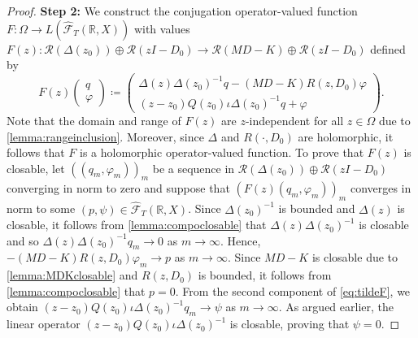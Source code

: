 \documentclass[english]{myarticle}
\begin{document}
\begin{sloppypar}
\begin{proof}
\textbf{Step 2:} We construct the conjugation operator-valued function $F : \Omega \to L(\hat{\mathcal{F}}_T(\mathbb{R},X))$ with values $F(z) : \mathcal{R}(\Delta(z_0)) \oplus \mathcal{R}(zI-D_0) \to \mathcal{R}(MD-K) \oplus \mathcal{R}(zI-D_0)$ defined by
\begin{equation} \label{eq:tildeF}
    F(z) 
    \begin{pmatrix}
        q \\
        \varphi
    \end{pmatrix}
    \coloneqq
    \begin{pmatrix}
        \Delta(z)\Delta(z_0)^{-1}q - (MD - K)R(z,D_0) \varphi \\
        (z-z_0)Q(z_0)\iota\Delta(z_0)^{-1}q + \varphi
    \end{pmatrix}.
\end{equation}
Note that the domain and range of $F(z)$ are $z$-independent for all $z \in \Omega$ due to \cref{lemma:rangeinclusion}. Moreover, since $\Delta$ and $R(\cdot,D_0)$ are holomorphic, it follows that $F$ is a holomorphic operator-valued function. To prove that $F(z)$ is closable, let $((q_m,\varphi_m))_m$ be a sequence in $\mathcal{R}(\Delta(z_0)) \oplus \mathcal{R}(zI - D_0)$ converging in norm to zero and suppose that $(F(z)(q_m,\varphi_m))_m$ converges in norm to some $(p,\psi) \in \hat{\mathcal{F}}_T(\mathbb{R},X)$. Since $\Delta(z_0)^{-1}$ is bounded and $\Delta(z)$ is closable, it follows from \cref{lemma:compoclosable} that $\Delta(z)\Delta(z_0)^{-1}$ is closable and so $\Delta(z)\Delta(z_0)^{-1} q_m \to 0$ as $m \to \infty$. Hence, $-(MD-K)R(z,D_0)\varphi_m \to p$ as $m \to \infty$. Since $MD - K$ is closable due to \cref{lemma:MDKclosable} and $R(z,D_0)$ is bounded, it follows from \cref{lemma:compoclosable} that $p = 0$. From the second component of \eqref{eq:tildeF},
we obtain $(z-z_0)Q(z_0)\iota \Delta(z_0)^{-1} q_m \to \psi$ as $m \to \infty$. As argued earlier, the linear operator $(z-z_0)Q(z_0)\iota \Delta(z_0)^{-1}$ is closable, proving that $\psi = 0$. 


\end{proof}
\end{sloppypar}
\end{document}

